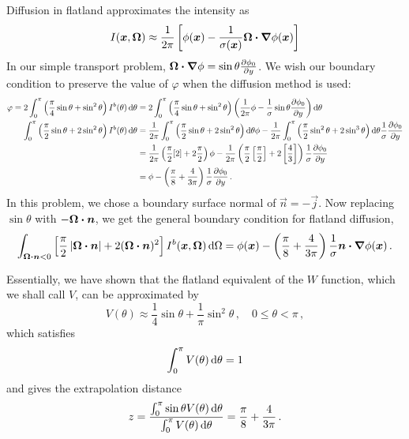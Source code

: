 Diffusion in flatland approximates the intensity as 
\begin{equation*}
  I(\bm{x}, \bm{\Omega}) \approx \frac{1}{2\pi} \left[ \phi(\bm{x}) -
  \frac{1}{\sigma(\bm{x})} \bm{\Omega}
\bm{\cdot} \bm{\nabla} \phi(\bm{x}) \right]
\end{equation*}
In our simple transport problem, $\bm{\Omega} \bm{\cdot} \bm{\nabla} \phi=\sin\theta
\frac{\partial \phi_0}{\partial y}$. We wish our boundary condition to preserve the value of
$\varphi$ when the diffusion method is used:
\begin{align*}
 \varphi = 2\int_{0}^{\pi} \left( \frac{\pi}{4} \sin\theta + \sin^2\theta \right)
 I^b(\theta) \mathop{}\!\mathrm{d}\theta
 &= 
  2\int_{0}^{\pi} \left( \frac{\pi}{4} \sin\theta + \sin^2\theta \right)
 \left( \frac{1}{2\pi} \phi -
  \frac{1}{\sigma} \sin\theta \frac{\partial \phi_0}{\partial y}\right)\mathop{}\!\mathrm{d}\theta
\\
\int_{0}^{\pi} \left( \frac{\pi}{2} \sin\theta + 2 \sin^2\theta \right)
 I^b(\theta) \mathop{}\!\mathrm{d}\theta
 &= 
\frac{1}{2\pi} \int_{0}^{\pi} \left( \frac{\pi}{2} \sin\theta + 2 \sin^2\theta
\right)\mathop{}\!\mathrm{d}\theta
 \phi -
 \frac{1}{2\pi} \int_{0}^{\pi} \left( \frac{\pi}{2} \sin^2\theta + 2 \sin^3\theta \right)\mathop{}\!\mathrm{d}\theta \frac{1}{\sigma} \frac{\partial \phi_0}{\partial y}
  \\
 &= 
 \frac{1}{2\pi} \left( \frac{\pi}{2} [2] + 2 \frac{\pi}{2}
\right) \phi
-
\frac{1}{2\pi} \left( \frac{\pi}{2} \left[ \frac{\pi}{2} \right] + 2 \left[
\frac{4}{3} \right] \right) \frac{1}{\sigma} \frac{\partial \phi_0}{\partial y}
\\
 &= 
  \phi
- \left( \frac{\pi}{8} + \frac{4}{3\pi} \right) \frac{1}{\sigma} \frac{\partial \phi_0}{\partial y}
\,.
\end{align*}
In this problem, we chose a boundary surface normal of $\vec{n}=-\vec{j}$. Now
replacing $\sin \theta$ with $-\bm{\Omega}\bm{\cdot}\bm{n}$, we get the general
boundary condition for flatland diffusion,
\begin{equation} \label{eq:flatlandDiffusionVarBc}
\int_{\bm{\Omega}\bm{\cdot}\bm{n} < 0} \left[ \frac{\pi}{2}
\left| \bm{\Omega}\bm{\cdot}\bm{n} \right| + 2 (\bm{\Omega}\bm{\cdot}\bm{n})^2 \right]
I^b(\bm{x}, \bm{\Omega}) \mathop{}\!\mathrm{d}\Omega
= 
  \phi(\bm{x})
  - \left( \frac{\pi}{8} + \frac{4}{3\pi} \right) \frac{1}{\sigma}
  \bm{n}\bm{\cdot}\bm{\nabla} \phi(\bm{x})\,.
\end{equation}

Essentially, we have shown that the flatland equivalent of the $W$ function,
which we shall call $V$, can be approximated by
\begin{equation}\label{eq:flatlandVariational}
  V(\theta)
  \approx \frac{1}{4}\sin\theta + \frac{1}{\pi} \sin^2\theta \,,\quad
  0 \le \theta < \pi \,,
\end{equation}
which satisfies
\begin{equation*}
  \int_{0}^{\pi} V(\theta) \mathop{}\!\mathrm{d}\theta= 1
\end{equation*}
and gives the extrapolation distance
\begin{equation*}
  z = \frac{\int_{0}^{\pi} \sin \theta V(\theta) \mathop{}\!\mathrm{d}\theta}{\int_{0}^{\pi}
  V(\theta) \mathop{}\!\mathrm{d}\theta} =  \frac{\pi}{8} + \frac{4}{3\pi} \,.
\end{equation*}

